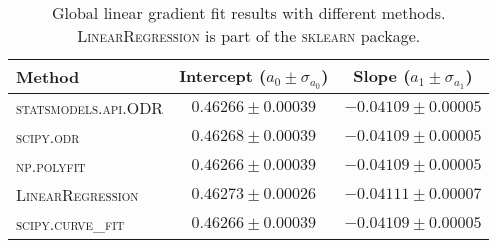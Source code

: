 \begin{table}
\centering
\caption{Global linear gradient fit results with different methods. \textsc{LinearRegression} is part of the \textsc{sklearn} package.}
\label{tab:global_fit_results_per_method}
\begin{tabularx}{\columnwidth}{lCC}
\hline
Method & Intercept ($a_0 \pm \sigma_{a_0}$) & Slope ($a_1 \pm \sigma_{a_1}$) \\
\hline
\textsc{statsmodels.api.ODR} & $0.46266 \pm 0.00039$ & $-0.04109 \pm 0.00005$ \\
\textsc{scipy.odr} & $0.46268 \pm 0.00039$ & $-0.04109 \pm 0.00005$ \\
\textsc{np.polyfit} & $0.46266 \pm 0.00039$ & $-0.04109 \pm 0.00005$ \\
\textsc{LinearRegression} & $0.46273 \pm 0.00026$ & $-0.04111 \pm 0.00007$ \\
\textsc{scipy.curve\_fit} & $0.46266 \pm 0.00039$ & $-0.04109 \pm 0.00005$ \\
\hline
\end{tabularx}
\end{table}